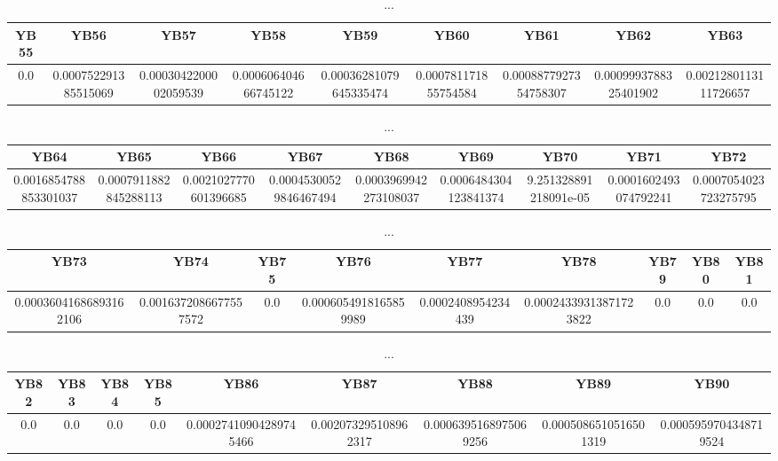 \documentclass[]{article}
\begin{document}
\begin{table}[h]
      \centering
      \begin{tabular}{|c|c|c|c|c|c|c|c|c|}
            \hline
            YB55 & YB56                 & YB57                  & YB58                 & YB59                   & YB60                 & YB61                  & YB62                  & YB63                  \\
            \hline
            0.0  & 0.000752291385515069 & 0.0003042200002059539 & 0.000606404666745122 & 0.00036281079645335474 & 0.000781171855754584 & 0.0008877927354758307 & 0.0009993788325401902 & 0.0021280113111726657 \\
            \hline
      \end{tabular}
      \caption{...}
\end{table}
\begin{table}[h]
      \centering
      \begin{tabular}{|c|c|c|c|c|c|c|c|c|}
            \hline
            YB64                  & YB65                  & YB66                  & YB67                   & YB68                  & YB69                  & YB70                  & YB71                  & YB72                  \\
            \hline
            0.0016854788853301037 & 0.0007911882845288113 & 0.0021027770601396685 & 0.00045300529846467494 & 0.0003969942273108037 & 0.0006484304123841374 & 9.251328891218091e-05 & 0.0001602493074792241 & 0.0007054023723275795 \\
            \hline
      \end{tabular}
      \caption{...}
\end{table}
\begin{table}[h]
      \centering
      \begin{tabular}{|c|c|c|c|c|c|c|c|c|}
            \hline
            YB73                   & YB74                  & YB75 & YB76                  & YB77               & YB78                   & YB79 & YB80 & YB81 \\
            \hline
            0.00036041686893162106 & 0.0016372086677557572 & 0.0  & 0.0006054918165859989 & 0.0002408954234439 & 0.00024339313871723822 & 0.0  & 0.0  & 0.0  \\
            \hline
      \end{tabular}
      \caption{...}
\end{table}
\begin{table}[h]
      \centering
      \begin{tabular}{|c|c|c|c|c|c|c|c|c|}
            \hline
            YB82 & YB83 & YB84 & YB85 & YB86                   & YB87                 & YB88                  & YB89                  & YB90                  \\
            \hline
            0.0  & 0.0  & 0.0  & 0.0  & 0.00027410904289745466 & 0.002073295108962317 & 0.0006395168975069256 & 0.0005086510516501319 & 0.0005959704348719524 \\
            \hline
      \end{tabular}
      \caption{...}
\end{table}
\end{document}
